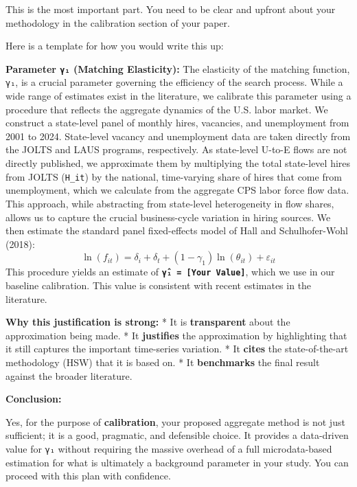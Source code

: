 \documentclass[
  11pt,
  letterpaper,
  DIV=11,
  numbers=noendperiod]{scrartcl}
\begin{document}
This is the most important part. You need to be clear and upfront about
your methodology in the calibration section of your paper.

Here is a template for how you would write this up:

\textbf{Parameter \texttt{γ₁} (Matching Elasticity):} The elasticity of
the matching function, \texttt{γ₁}, is a crucial parameter governing the
efficiency of the search process. While a wide range of estimates exist
in the literature, we calibrate this parameter using a procedure that
reflects the aggregate dynamics of the U.S. labor market. We construct a
state-level panel of monthly hires, vacancies, and unemployment from
2001 to 2024. State-level vacancy and unemployment data are taken
directly from the JOLTS and LAUS programs, respectively. As state-level
U-to-E flows are not directly published, we approximate them by
multiplying the total state-level hires from JOLTS (\texttt{H\_it}) by
the national, time-varying share of hires that come from unemployment,
which we calculate from the aggregate CPS labor force flow data. This
approach, while abstracting from state-level heterogeneity in flow
shares, allows us to capture the crucial business-cycle variation in
hiring sources. We then estimate the standard panel fixed-effects model
of Hall and Schulhofer-Wohl (2018):
\[ \ln(f_{it}) = \delta_i + \delta_t + (1-\gamma_1) \ln(\theta_{it}) + \varepsilon_{it} \]
This procedure yields an estimate of
\textbf{\texttt{γ̂₁\ =\ {[}Your\ Value{]}}}, which we use in our baseline
calibration. This value is consistent with recent estimates in the
literature.

\textbf{Why this justification is strong:} * It is \textbf{transparent}
about the approximation being made. * It \textbf{justifies} the
approximation by highlighting that it still captures the important
time-series variation. * It \textbf{cites} the state-of-the-art
methodology (HSW) that it is based on. * It \textbf{benchmarks} the
final result against the broader literature.

\textbf{Conclusion:}

Yes, for the purpose of \textbf{calibration}, your proposed aggregate
method is not just sufficient; it is a good, pragmatic, and defensible
choice. It provides a data-driven value for \texttt{γ₁} without
requiring the massive overhead of a full microdata-based estimation for
what is ultimately a background parameter in your study. You can proceed
with this plan with confidence.
\end{document}
